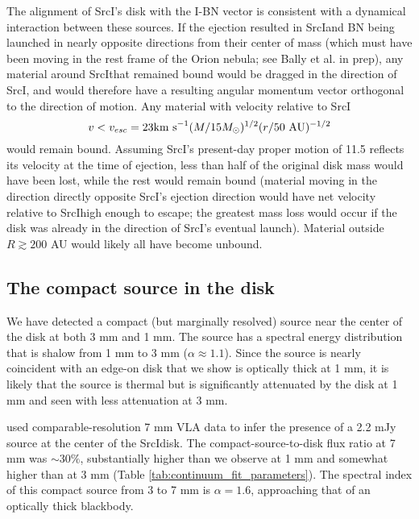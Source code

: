 \documentclass[twocolumn]{aastex61}
\newcommand{\sourcei}{SrcI}
\begin{document}
The alignment of \sourcei's disk with the I-BN vector is consistent with a
dynamical interaction between these sources.  If the ejection resulted in
\sourcei and BN being launched in nearly opposite directions from their center
of mass (which must have been moving in the rest frame of the Orion nebula; see
Bally et al. in prep), any material around \sourcei that remained bound would
be dragged in the direction of \sourcei, and would therefore have a resulting
angular momentum vector orthogonal to the direction of motion.  Any material
with
velocity relative to \sourcei 
$$v < v_{esc} = 23 \textrm{km~s}^{-1} (M/15M_{\odot})^{1/2}  (r/50~\mathrm{AU})^{-1/2}$$
would remain bound.
Assuming \sourcei's present-day proper motion of 11.5 \kms reflects its velocity
at the time of ejection, less than half of the original disk mass would
have been lost, while the rest would remain bound (material moving in the
direction directly opposite \sourcei's ejection direction would have net
velocity relative to \sourcei high enough to escape; the greatest mass
loss would occur if the disk was already in the direction of \sourcei's eventual
launch).
Material outside $R\gtrsim200$ AU would likely all have become unbound.


\subsection{The compact source in the disk}
\label{sec:ptsrc}
We have detected a compact (but marginally resolved) source near the center of
the disk at both 3 mm and 1 mm.  The source has a spectral energy distribution
that is shalow from 1 mm to 3 mm ($\alpha\approx1.1$).  Since the source is nearly
coincident with an edge-on disk that we show is optically thick at 1 mm, it is
likely that the source is thermal but is significantly attenuated by the disk
at 1 mm and seen with less attenuation at 3 mm.

\citet{Reid2007a} used comparable-resolution 7 mm VLA data to infer
the presence of a 2.2 mJy source at the center of the \sourcei disk.
The compact-source-to-disk flux ratio at 7 mm was $\sim30\%$, substantially
higher than we observe at 1 mm and somewhat
higher than at 3 mm (Table \ref{tab:continuum_fit_parameters}).  
The spectral index of this compact source from 3 to 7 mm is $\alpha=1.6$,
approaching that of an optically
thick blackbody.
\end{document}
